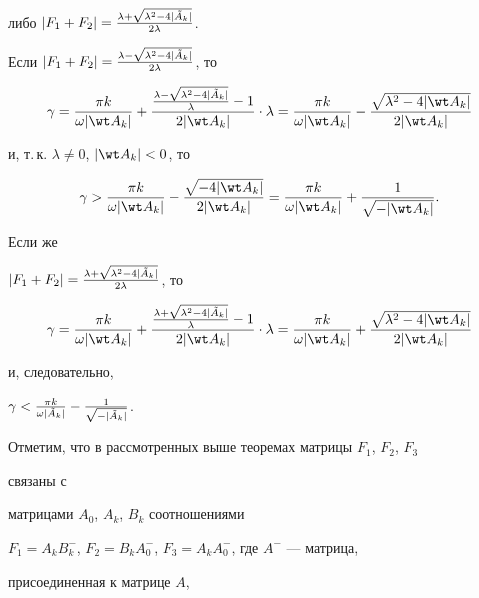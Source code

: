 либо $|F_1+F_2|=\frac{\lambda+\sqrt{\lambda^2-4|\Tilde A_k|}}{2\lambda}$. 


 


Если $|F_1+F_2|=\frac{\lambda-\sqrt{\lambda^2-4|\Tilde A_k|}}{2\lambda}$, то 


$$ 


\gamma=\frac{\pi k}{\omega|\wt A_k|}+ 


\frac{\frac{\lambda-\sqrt{\lambda^2-4|\Tilde A_k|}}{\lambda}-1} 


{2|\wt A_k|}\cdot\lambda=\frac{\pi k}{\omega|\wt A_k|}- 


\frac{\sqrt{\lambda^2-4|\wt A_k|}}{2|\wt A_k|} 


$$ 


и, т.\,к. $\lambda\ne0$, $|\wt A_k|<0$, то 


$$ 


\gamma>\frac{\pi k}{\omega|\wt A_k|}- 


\frac{\sqrt{-4|\wt A_k|}}{2|\wt A_k|}= 


\frac{\pi k}{\omega|\wt A_k|}+\frac{1}{\sqrt{-|\wt A_k|}}. 


$$ 


Если же 


$|F_1+F_2|=\frac{\lambda+\sqrt{\lambda^2-4|\Tilde A_k|}}{2\lambda}$, то 


$$ 


\gamma=\frac{\pi k}{\omega|\wt A_k|}+ 


\frac{\frac{\lambda+\sqrt{\lambda^2-4|\Tilde A_k|}}{\lambda}-1} 


{2|\wt A_k|}\cdot\lambda=\frac{\pi k}{\omega|\wt A_k|}+ 


\frac{\sqrt{\lambda^2-4|\wt A_k|}}{2|\wt A_k|} 


$$ 


и, следовательно,


$\gamma<\frac{\pi k}{\omega|\Tilde A_k|}- \frac{1}{\sqrt{-|\Tilde 


A_k|}}$. 


 


Отметим, что в рассмотренных выше теоремах матрицы $F_1$, $F_2$, $F_3$ 


связаны с 


матрицами $A_0$, $A_k$, $B_k$ соотношениями 


$F_1=A_k B^-_k$, $F_2=B_k A^-_0$, $F_3=A_k A^-_0$, где $A^-$ --- матрица, 


присоединенная к матрице $A$, 


